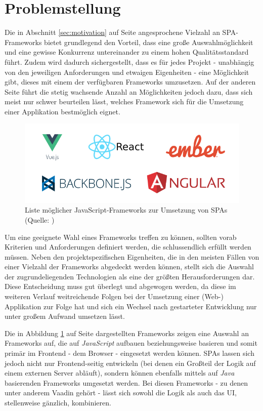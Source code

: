 \documentclass[a4paper,12pt,twoside]{scrreprt}
\begin{document}
\section{Problemstellung}
\label{sec:problemstellung}
Die in Abschnitt \ref{sec:motivation} auf Seite \pageref{sec:motivation} angesprochene Vielzahl an \acs{SPA}-Frameworks bietet grundlegend den Vorteil, dass eine große Auswahlmöglichkeit und eine gewisse Konkurrenz untereinander zu einem hohen Qualitätsstandard führt. Zudem wird dadurch sichergestellt, dass es für jedes Projekt - unabhängig von den jeweiligen Anforderungen und etwaigen Eigenheiten - eine Möglichkeit gibt, dieses mit einem der verfügbaren Frameworks umzusetzen. Auf der anderen Seite führt die stetig wachsende Anzahl an Möglichkeiten jedoch dazu, dass sich meist nur schwer beurteilen lässt, welches Framework sich für die Umsetzung einer Applikation bestmöglich eignet.

\begin{figure}[ht]
    \centering
    \includegraphics[scale=0.5]{images/js-frameworks.png}
    \caption[Liste möglicher JavaScript-Frameworks zur Umsetzung von \aclp{SPA}]{Liste möglicher JavaScript-Frameworks zur Umsetzung von \aclp{SPA} (Quelle: \cite{a_best_2020})}
    \label{fig:js-frameworks}
\end{figure}

Um eine geeignete Wahl eines Frameworks treffen zu können, sollten vorab Kriterien und Anforderungen definiert werden, die schlussendlich erfüllt werden müssen. Neben den projektspezifischen Eigenheiten, die in den meisten Fällen von einer Vielzahl der Frameworks abgedeckt werden können, stellt sich die Auswahl der zugrundeliegenden Technologien als eine der größten Herausforderungen dar. Diese Entscheidung muss gut überlegt und abgewogen werden, da diese im weiteren Verlauf weitreichende Folgen bei der Umsetzung einer (Web-) Applikation zur Folge hat und sich ein Wechsel nach gestarteter Entwicklung nur unter großem Aufwand umsetzen lässt.

Die in Abbildung \ref{fig:js-frameworks} auf Seite \pageref{fig:js-frameworks} dargestellten Frameworks zeigen eine Auswahl an Frameworks auf, die auf \textit{JavaScript} aufbauen beziehungsweise basieren und somit primär im Frontend - dem Browser -  eingesetzt werden können. \aclp{SPA} lassen sich jedoch nicht nur Frontend-seitig entwickeln (bei denen ein Großteil der Logik auf einem externen Server abläuft), sondern können ebenfalls mittels auf \textit{Java} basierenden Frameworks umgesetzt werden. Bei diesen Frameworks - zu denen unter anderem Vaadin gehört - lässt sich sowohl die Logik als auch das \ac{UI}, stellenweise gänzlich, kombinieren.
\end{document}
